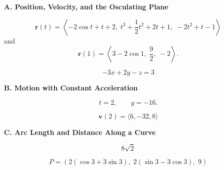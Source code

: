 \documentclass[10pt]{article}
\newcommand{\answerbar}[1]{%
  \vspace{0.55em}%
  \noindent\colorbox{sectiongray}{%
    \parbox{\dimexpr\textwidth-2\fboxsep\relax}{%
      \strut\textbf{#1}\strut
    }%
  }%
  \par\vspace{0.50em}%
}
\begin{document}
\vspace{0.30em}


\answerbar{A. Position, Velocity, and the Osculating Plane}

\begin{parts}

\item
\[
\boxed{
\mathbf r(t)
=
\left\langle
-2\cos t+t+2,\;
t^3+\frac12t^2+2t+1,\;
-2t^2+t-1
\right\rangle
}
\]
and
\[
\boxed{
\mathbf r(1)
=
\left\langle
3-2\cos1,\;
\frac92,\;
-2
\right\rangle
}.
\]

\item
\[
\boxed{-3x+2y-z=3}
\]

\end{parts}

\vspace{0.25em}


\answerbar{B. Motion with Constant Acceleration}

\begin{parts}

\item
\[
\boxed{t=2},
\qquad
\boxed{g=-16}.
\]

\item
\[
\boxed{\mathbf v(2)=\langle6,-32,8\rangle}
\]

\end{parts}

\vspace{0.25em}


\answerbar{C. Arc Length and Distance Along a Curve}

\begin{parts}

\item
\[
\boxed{8\sqrt2}
\]

\item
\[
\boxed{
P=
\left(
2(\cos3+3\sin3),\;
2(\sin3-3\cos3),\;
9
\right)
}
\]

\end{parts}
\end{document}
